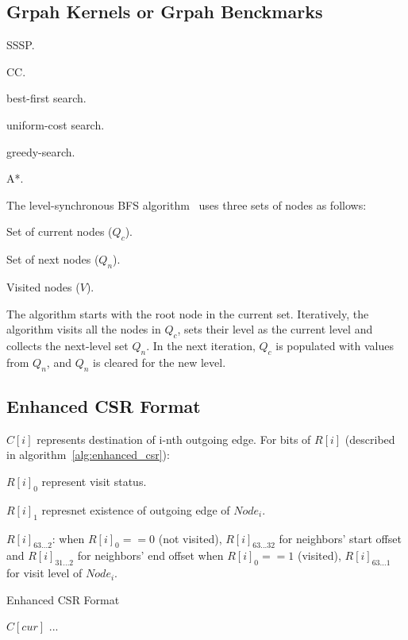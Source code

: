 \documentclass[UTF8,12pt,a4paper]{article}
\begin{document}
\subsection{Grpah Kernels or Grpah Benckmarks}
\begin{compactitem}
  \item SSSP.
  \item CC.
  \item best-first search.
  \item uniform-cost search.
  \item greedy-search.
  \item A*.
\end{compactitem}

The level-synchronous BFS algorithm~\cite{DBLP:conf/ipps/AttiaJTJZ14}
uses three sets of nodes as follows:
\begin{compactitem}
  \item Set of current nodes ($Q_c$).
  \item Set of next nodes ($Q_n$).
  \item Visited nodes ($V$).
\end{compactitem}

The algorithm starts with the root node in the current set.
Iteratively, the algorithm visits all the nodes in $Q_c$,
sets their level as the current level
and collects the next-level set $Q_n$.
In the next iteration, $Q_c$ is populated with values from $Q_n$,
and $Q_n$ is cleared for the new level.

\subsection{Enhanced CSR Format}
$C[i]$ represents destination of i-nth outgoing edge.
For bits of $R[i]$ (described in algorithm~\ref{alg:enhanced_csr}):
\begin{compactitem}
  \item $R[i]_0$ represent visit status.
  \item $R[i]_1$ represnet existence of outgoing edge of $Node_i$.
  \item $R[i]_{63...2}$:
  when $R[i]_0 == 0$ (not visited),
  $R[i]_{63...32}$ for neighbors' start offset
  and $R[i]_{31...2}$ for neighbors' end offset
  when $R[i]_0 == 1$ (visited),
  $R[i]_{63...1}$ for visit level of $Node_i$.
\end{compactitem}
\begin{algorithm}
  \algrenewcommand{}
  \algrenewcommand{}
  \caption{Enhanced CSR Format}
  \label{alg:enhanced_csr}
  \begin{algorithmic}[1]
      \State $C[cur]$ ...
    \EndFor
  \end{algorithmic}
\end{algorithm}
\end{document}
